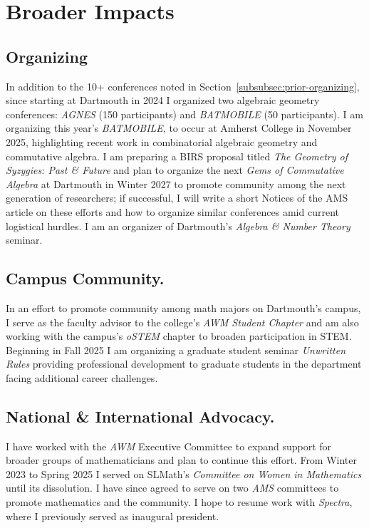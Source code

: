 \documentclass[11pt,reqno]{amsart}
\theoremstyle{remark}
\begin{document}
\section{Broader Impacts}\label{sec:broader-impacts} 


\subsection{Organizing} In addition to the 10+ conferences noted in Section~\ref{subsubsec:prior-organizing}, since starting at Dartmouth in 2024 I organized two algebraic geometry conferences: \textit{AGNES} (150 participants) and \textit{BATMOBILE} (50 participants). I am organizing this year's \textit{BATMOBILE}, to occur at Amherst College in November 2025, highlighting recent work in combinatorial algebraic geometry and commutative algebra. I am preparing a BIRS proposal titled \textit{The Geometry of Syzygies: Past \& Future} and plan to organize the next \textit{Gems of Commutative Algebra} at Dartmouth in Winter 2027 to promote community among the next generation of researchers; if successful, I will write a short Notices of the AMS article on these efforts and how to organize similar conferences amid current logistical hurdles. I am an organizer of Dartmouth's \textit{Algebra \& Number Theory} seminar. 

\subsection{Campus Community.} In an effort to promote community among math majors on Dartmouth's campus, I serve as the faculty advisor to the college's \textit{AWM Student Chapter} and  am also working with the campus's \textit{oSTEM} chapter to broaden participation in STEM. Beginning in Fall 2025 I am organizing a graduate student seminar \textit{Unwritten Rules} providing professional development to graduate students in the department facing additional career challenges.

\subsection{ National \& International Advocacy.} I have worked with the \textit{AWM} Executive Committee to expand support for broader groups of mathematicians and plan to continue this effort. From Winter 2023 to Spring 2025 I served on SLMath's  \textit{Committee on Women in Mathematics} until its dissolution. I have since agreed to serve on two \textit{AMS} committees to promote mathematics and the community. I hope to resume work with \textit{Spectra}, where I previously served as inaugural president.
\end{document}
